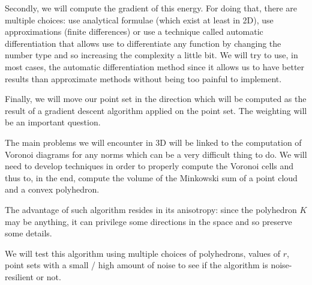 Secondly, we will compute the gradient of this energy. For doing that, there are
multiple choices: use analytical formulae (which exist at least in 2D), use
approximations (finite differences) or use a technique called automatic
differentiation that allows use to differentiate any function by changing the
number type and so increasing the complexity a little bit. We will try to use,
in most cases, the automatic differentiation method since it allows us to
have better results than approximate methods without being too painful to
implement.

Finally, we will move our point set in the direction which will be computed as
the result of a gradient descent algorithm applied on the point set. The
weighting will be an important question.

The main problems we will encounter in 3D will be linked to the computation of
Voronoi diagrams for any norms which can be a very difficult thing to do. We
will need to develop techniques in order to properly compute the Voronoi cells
and thus to, in the end, compute the volume of the Minkowski sum of a point
cloud and a convex polyhedron.

The advantage of such algorithm resides in its anisotropy: since the polyhedron
$ K $ may be anything, it can privilege some directions in the space and so
preserve some details.

We will test this algorithm using multiple choices of polyhedrons, values of $ r
$, point sets with a small / high amount of noise to see if the algorithm is
noise-resilient or not.

